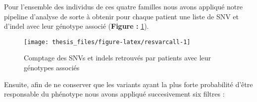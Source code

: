 \documentclass[12pt,twoside]{reedthesis}
\theoremstyle{definition}
\theoremstyle{definition}
\theoremstyle{remark}
\begin{document}
  Pour l'ensemble des individus de ces quatre familles nous avons appliqué
  notre pipeline d'analyse de sorte à obtenir pour chaque patient une
  liste de SNV et d'indel avec leur génotype associé (\textbf{Figure :
  }\ref{fig:resvarcall}).
  
  \begin{figure}
  
  {\centering \texttt{[image: thesis\_files/figure-latex/resvarcall-1]} 
  
  }
  
  \caption[Comptage des SNVs et indels retrouvés par patients avec leur génotypes associés]{Comptage des SNVs et indels retrouvés par patients avec leur génotypes associés}\label{fig:resvarcall}
  \end{figure}
  
  Ensuite, afin de ne conserver que les variants ayant la plus forte
  probabilité d'être responsable du phénotype nous avons appliqué
  succesivement six filtres :
  
\end{document}
